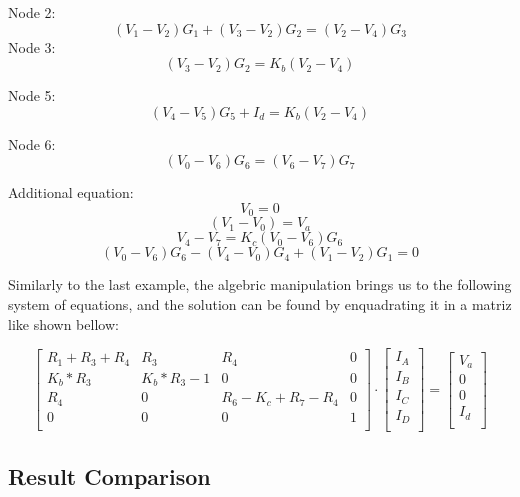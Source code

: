 Node 2:
$$ (V_1 - V_2)G_1 + (V_3 - V_2)G_2 = (V_2 - V_4)G_3 $$
Node 3:
$$ (V_3 - V_2)G_2 = K_b(V_2 - V_4) $$

Node 5:
$$ (V_4 - V_5)G_5 + I_d = K_b(V_2 - V_4) $$

Node 6:
$$ (V_0 - V_6)G_6 = (V_6 - V_7)G_7 $$

Additional equation:
$$ V_0 = 0 $$
$$ (V_1 - V_0) = V_a $$
$$ V_4 - V_7 = K_c(V_0 - V_6)G_6$$
$$ (V_0 -V_6)G_6 - (V_4 - V_0)G_4 + (V_1 - V_2)G_1 = 0 $$

Similarly to the last example, the algebric manipulation brings us to the following system of equations, 
and the solution can be found by enquadrating it in a matriz like shown bellow:

\[
\begin{bmatrix}
R_1 + R_3 + R_4 & R_3 & R_4 & 0\\
K_b * R_3 & K_b * R_3 - 1 & 0 & 0\\
R_4 & 0 & R_6 - K_c + R_7 - R_4 & 0\\
0 & 0 & 0 & 1\\
\end{bmatrix}
\cdot
\begin{bmatrix}
I_A\\
I_B\\
I_C\\
I_D\\
\end{bmatrix}
=
\begin{bmatrix}
V_a\\
0\\
0\\
I_d\\
\end{bmatrix}
\]

\subsection{Result Comparison }